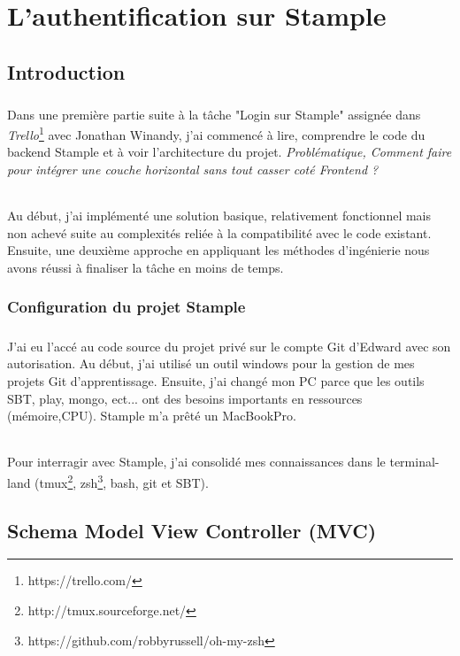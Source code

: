 \chapter{L'authentification sur Stample}
\section*{}
\section{Introduction}
\paragraph{}
Dans une première partie suite à la tâche "Login sur Stample" assignée dans \textit{Trello}\footnote{https://trello.com/} avec Jonathan Winandy, j'ai commencé à lire, comprendre le code du backend Stample et à voir l'architecture du projet. 
\newline
\textit{Problématique, Comment faire pour intégrer une couche horizontal sans tout casser coté Frontend ?}
\subparagraph{}
Au début, j'ai implémenté une solution basique, relativement fonctionnel mais non achevé suite au complexités reliée à la compatibilité avec le code existant.
Ensuite, une deuxième approche en appliquant les méthodes d'ingénierie nous avons réussi à finaliser la tâche en moins de temps.

\subsection{Configuration du projet Stample}
\paragraph{}
J'ai eu l'accé au code source du projet privé sur le compte Git d'Edward avec son autorisation.
Au début, j'ai utilisé un outil windows pour la gestion de mes projets Git d'apprentissage.
Ensuite, j'ai changé mon PC parce que les outils SBT, play, mongo, ect... ont des besoins importants en ressources (mémoire,CPU). Stample m'a prêté un MacBookPro. 
\subparagraph{}
Pour interragir avec Stample, j'ai consolidé mes connaissances dans le terminal-land (tmux\footnote{http://tmux.sourceforge.net/}, zsh\footnote{https://github.com/robbyrussell/oh-my-zsh}, bash, git et SBT).
\section{Schema Model View Controller (MVC)}
